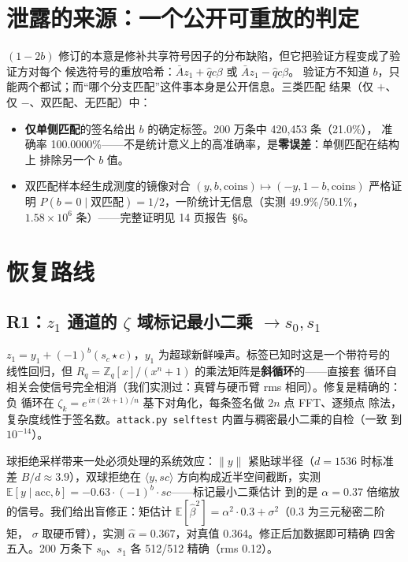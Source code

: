 \documentclass[UTF8,11pt,a4paper]{ctexart}
\newcommand{\code}[1]{\texttt{\small #1}}
\begin{document}
\section{泄露的来源：一个公开可重放的判定}

$(1-2b)$ 修订的本意是修补共享符号因子的分布缺陷，但它把验证方程变成了验证方对每个
候选符号的重放哈希：$\bar A z_1 + \hat q c\beta$ 或 $\bar A z_1 - \hat q c\beta$。
验证方不知道 $b$，只能两个都试；而``哪个分支匹配''这件事本身是公开信息。三类匹配
结果（仅 $+$、仅 $-$、双匹配、无匹配）中：

\begin{itemize}
\item \textbf{仅单侧匹配}的签名给出 $b$ 的确定标签。200 万条中 420{,}453 条（21.0\%），
  准确率 100.0000\%——不是统计意义上的高准确率，是\textbf{零误差}：单侧匹配在结构上
  排除另一个 $b$ 值。
\item 双匹配样本经生成测度的镜像对合 $(y,b,\mathrm{coins}) \mapsto (-y,1-b,\mathrm{coins})$
  严格证明 $P(b{=}0 \mid \text{双匹配}) = 1/2$，一阶统计无信息（实测
  49.9\%/50.1\%，$1.58\times10^6$ 条）——完整证明见 14 页报告~\S6。
\end{itemize}

\section{恢复路线}

\subsection{R1：$z_1$ 通道的 $\zeta$ 域标记最小二乘 $\to s_0, s_1$}

$z_1 = y_1 + (-1)^b (s_c \star c)$，$y_1$ 为超球新鲜噪声。标签已知时这是一个带符号的
线性回归，但 $R_q = \mathbb{Z}_q[x]/(x^n+1)$ 的乘法矩阵是\textbf{斜循环}的——直接套
循环自相关会使信号完全相消（我们实测过：真臂与硬币臂 rms 相同）。修复是精确的：负
循环在 $\zeta_k = e^{\,i\pi(2k+1)/n}$ 基下对角化，每条签名做 $2n$ 点 FFT、逐频点
除法，复杂度线性于签名数。\code{attack.py selftest} 内置与稠密最小二乘的自检（一致
到 $10^{-14}$）。

球拒绝采样带来一处必须处理的系统效应：$\|y\|$ 紧贴球半径（$d=1536$ 时标准差
$B/d \approx 3.9$），双球拒绝在 $\langle y, sc\rangle$ 方向构成近半空间截断，实测
$\mathbb{E}[y \mid \mathrm{acc}, b] = -0.63\cdot(-1)^b\cdot sc$——标记最小二乘估计
到的是 $\alpha = 0.37$ 倍缩放的信号。我们给出盲修正：矩估计
$\mathbb{E}[\hat\beta^2] = \alpha^2\cdot 0.3 + \sigma^2$（0.3 为三元秘密二阶矩，
$\sigma$ 取硬币臂），实测 $\hat\alpha = 0.367$，对真值 0.364。修正后加数据即可精确
四舍五入。200 万条下 $s_0$、$s_1$ 各 512/512 精确（rms 0.12）。
\end{document}
